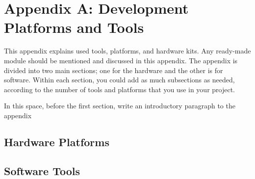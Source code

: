 \section{Appendix A: Development Platforms and Tools}
This appendix explains used tools, platforms, and hardware kits. Any ready-made module should be mentioned and discussed in this appendix. The appendix is divided into two main sections; one for the hardware and the other is for software. Within each section, you could add as much subsections as needed, according to the number of tools and platforms that you use in your project.

In this space, before the first section, write an introductory paragraph to the appendix

\subsection{Hardware Platforms}
\subsection{Software Tools}

